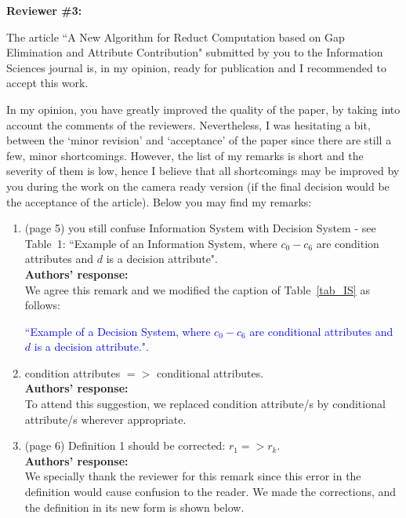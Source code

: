 \documentclass{letter}
\begin{document}
\begin{letter}{}
\begin{enumerate}
\begin{itemize}
		
	\end{itemize}
  \end{enumerate}
  
  \textbf{Reviewer \#3:}
  
  The article ``A New Algorithm for Reduct Computation based on Gap Elimination and Attribute Contribution" submitted by you to the Information Sciences journal is, in my opinion, ready for publication and I recommended to accept this work. 
  
  In my opinion, you have greatly improved the quality of the paper, by taking into account the comments of the reviewers. Nevertheless, I was hesitating a bit, between the `minor revision' and `acceptance' of the paper since there are still a few, minor shortcomings. However, the list of my remarks is short and the severity of them is low, hence I believe that all shortcomings may be improved by you during the work on the camera ready version (if the final decision would be the acceptance of the article). Below you may find my remarks:  
 
 \begin{enumerate}  
	\item (page 5) you still confuse Information System with Decision System - see Table~1: ``Example of an Information System, where $c_0 - c_6$ are condition attributes and $d$ is a decision attribute".\\
	\textbf{Authors’ response:} \\	
	We agree this remark and we modified the caption of Table~\ref{tab_IS} as follows:
	
	\textcolor{blue}{``Example of a Decision System, where $c_0-c_6$ are conditional attributes and $d$ is a decision attribute.".}
	
	\item condition attributes $=>$ conditional attributes.\\
	\textbf{Authors’ response:}\\
	To attend this suggestion, we replaced condition attribute/s by conditional attribute/s wherever appropriate.
	
	\item (page 6) Definition 1 should be corrected: $r_1 => r_k.$\\
	\textbf{Authors’ response:}\\
	We specially thank the reviewer for this remark since this error in the definition would cause confusion to the reader. We made the corrections, and the definition in its new form is shown below.
	

\end{enumerate}
\end{letter}
\end{document}
